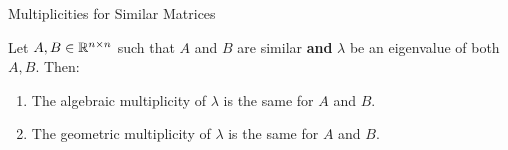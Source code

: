 \documentclass[xcoler=dvipsnames, aspectratio=169]{beamer}
\begin{document}
    \begin{frame}{Multiplicities for Similar Matrices}
        \begin{theorem}
            Let $A,B\in\mathbb{R}^{n\times n}$ such that $A$ and $B$ are similar \textbf{and} $\lambda$ be an eigenvalue of both $A,B$. Then:
            \begin{enumerate}
                \pause\item The algebraic multiplicity of $\lambda$ is the same for $A$ and
                    $B$.
                \pause\item The geometric multiplicity of $\lambda$ is the same for $A$ and
                    $B$.
            \end{enumerate}
        \end{theorem}
    \end{frame}
\end{document}
